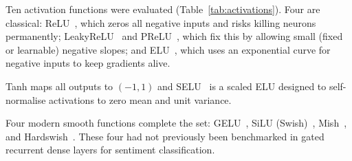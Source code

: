 \documentclass[conference]{IEEEtran}
\begin{document}
Ten activation functions were evaluated
(Table~\ref{tab:activations}). Four are classical:
ReLU~\cite{nair2010}, which zeros all negative inputs and
risks killing neurons permanently;
LeakyReLU~\cite{maas2013} and PReLU~\cite{he2015}, which fix
this by allowing small (fixed or learnable) negative slopes;
and ELU~\cite{clevert2015}, which uses an exponential curve
for negative inputs to keep gradients alive.

Tanh maps all outputs to $(-1,1)$ and
SELU~\cite{klambauer2017} is a scaled ELU designed to
self-normalise activations to zero mean and unit variance.

Four modern smooth functions complete the set: GELU~\cite{hendrycks2016},
SiLU (Swish)~\cite{ramachandran2017}, Mish~\cite{misra2020},
and Hardswish~\cite{howard2019}. These four had not previously been
benchmarked in gated recurrent dense layers for sentiment
classification.

\begin{table}[htbp]
  \caption{Activation Functions: Families and Key Properties}
  \label{tab:activations}
  \centering\footnotesize
  \setlength{\tabcolsep}{3pt}
  \renewcommand{\arraystretch}{1.05}
\end{table}
\end{document}
